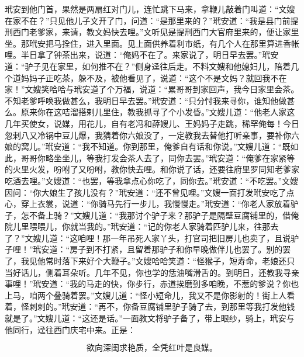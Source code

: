玳安到他门首，果然是两扇红对门儿，连忙跳下马来，拿鞭儿敲着门叫道：“文嫂在家不在？”只见他儿子文\textSiTang 开了门，问道：“是那里来的？”玳安道：“我是县门前提刑西门老爹家，来请，教文妈快去哩。”文\textSiTang 听见是提刑西门大官府里来的，便让家里坐。那玳安把马拴住，进入里面。见上面供养着利市纸，有几个人在那里算进香帐哩。半日拿了钟茶出来，说道：“俺妈不在了。来家说了，明日早去罢。”玳安道：“驴子见在家里，如何推不在？”侧身迳往后走。不料文嫂和他媳妇儿，陪着几个道妈妈子正吃茶，躲不及，被他看见了，说道：“这个不是文妈？就回我不在家！”文嫂笑哈哈与玳安道了个万福，说道：“累哥哥到家回声，我今日家里会茶。不知老爹呼唤我做甚么，我明日早去罢。”玳安道：“只分忖我来寻你，谁知他做甚么。原来你在这咭溜搭剌儿里住，教我抓寻了个小发昏。”文嫂儿道：“他老人家这几年买使女，说媒，用花儿，自有老冯和薛嫂儿、王妈妈子走跳，稀罕俺每！今日忽剌八又冷锅中豆儿爆，我猜着你六娘没了，一定教我去替他打听亲事，要补你六娘的窝儿。”玳安道：“我不知道。你到那里，俺爹自有话和你说。”文嫂儿道：“既如此，哥哥你略坐坐儿，等我打发会茶人去了，同你去罢。”玳安道：“俺爹在家紧等的火里火发，吩咐了又吩咐，教你快去哩。和你说了话，还要往府里罗同知老爹家吃酒去哩。”文嫂道：“也罢，等我拿点心你吃了，同你去。”玳安道：“不吃罢。”文嫂因问：“你大娘生了孩儿没有？”玳安道：“还不曾见哩。”文嫂一面打发玳安吃了点心，穿上衣裳，说道：“你骑马先行一步儿，我慢慢走。”玳安道：“你老人家放着驴子，怎不备上骑？”文嫂儿道：“我那讨个驴子来？那驴子是隔壁豆腐铺里的，借俺院儿里喂喂儿，你就当我的。”玳安道：“记的你老人家骑着匹驴儿来，往那去了？”文嫂儿道：“这咱哩！那一年吊死人家丫头，打官司把旧房儿也卖了，且说驴子哩！”玳安道：“房子到不打紧，且留着那驴子和你早晚做伴儿也罢了。别的罢了，我见他常时落下来好个大鞭子。”文嫂哈哈笑道：“怪猴子，短寿命，老娘还只当好话儿，侧着耳朵听。几年不见，你也学的恁油嘴滑舌的。到明日，还教我寻亲事哩！”玳安道：“我的马走的快，你步行，赤道挨磨到多咱晚，不惹的爹说？你也上马，咱两个叠骑着罢。”文嫂儿道：“怪小短命儿，我又不是你影射的！街上人看着，怪剌剌的。”玳安道：“再不，你备豆腐铺里驴子骑了去，到那里等我打发他钱就是了。”文嫂儿道：“这还是话。”一面教文\textSiTang 将驴子备了，带上眼纱，骑上，玳安与他同行，迳往西门庆宅中来。正是：

\[
欲向深闺求艳质，全凭红叶是良媒。
\]

